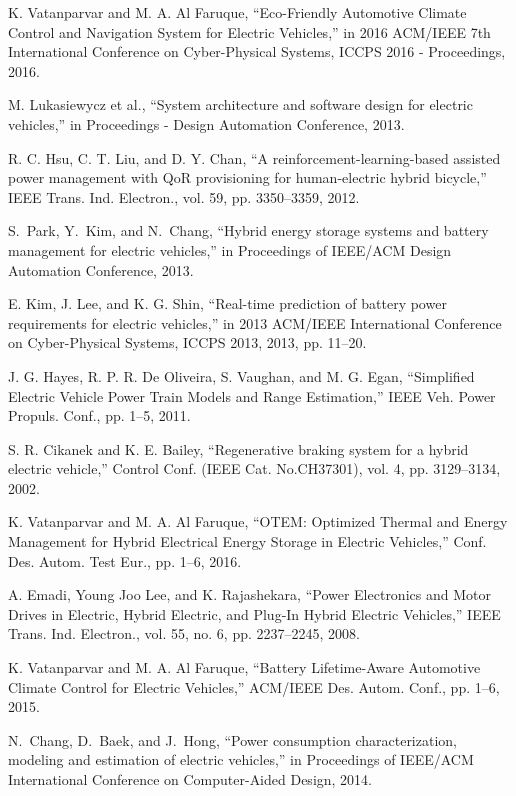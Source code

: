 K. Vatanparvar and M. A. Al Faruque, ``Eco-Friendly Automotive Climate Control and Navigation System for Electric Vehicles,'' in 2016 ACM/IEEE 7th International Conference on Cyber-Physical Systems, ICCPS 2016 - Proceedings, 2016.

M. Lukasiewycz et al., ``System architecture and software design for electric vehicles,'' in Proceedings - Design Automation Conference, 2013.

R. C. Hsu, C. T. Liu, and D. Y. Chan, ``A reinforcement-learning-based assisted power management with QoR provisioning for human-electric hybrid bicycle,'' IEEE Trans. Ind. Electron., vol. 59, pp. 3350–3359, 2012.

S.~Park, Y.~Kim, and N.~Chang, ``Hybrid energy storage systems and battery
  management for electric vehicles,'' in Proceedings of IEEE/ACM Design
  Automation Conference, 2013.

E. Kim, J. Lee, and K. G. Shin, ``Real-time prediction of battery power requirements for electric vehicles,'' in 2013 ACM/IEEE International Conference on Cyber-Physical Systems, ICCPS 2013, 2013, pp. 11–20.

J. G. Hayes, R. P. R. De Oliveira, S. Vaughan, and M. G. Egan, ``Simplified Electric Vehicle Power Train Models and Range Estimation,'' IEEE Veh. Power Propuls. Conf., pp. 1–5, 2011.

S. R. Cikanek and K. E. Bailey, ``Regenerative braking system for a hybrid electric vehicle,'' Control Conf. (IEEE Cat. No.CH37301), vol. 4, pp. 3129–3134, 2002.

K. Vatanparvar and M. A. Al Faruque, ``OTEM: Optimized Thermal and Energy Management for Hybrid Electrical Energy Storage in Electric Vehicles,'' Conf. Des. Autom. Test Eur., pp. 1–6, 2016.

A. Emadi, Young Joo Lee, and K. Rajashekara, ``Power Electronics and Motor Drives in Electric, Hybrid Electric, and Plug-In Hybrid Electric Vehicles,'' IEEE Trans. Ind. Electron., vol. 55, no. 6, pp. 2237–2245, 2008.

K. Vatanparvar and M. A. Al Faruque, ``Battery Lifetime-Aware Automotive Climate Control for Electric Vehicles,'' ACM/IEEE Des. Autom. Conf., pp. 1–6, 2015.

N.~Chang, D.~Baek, and J.~Hong, ``Power consumption characterization, modeling
  and estimation of electric vehicles,'' in Proceedings of IEEE/ACM
  International Conference on Computer-Aided Design, 2014.


